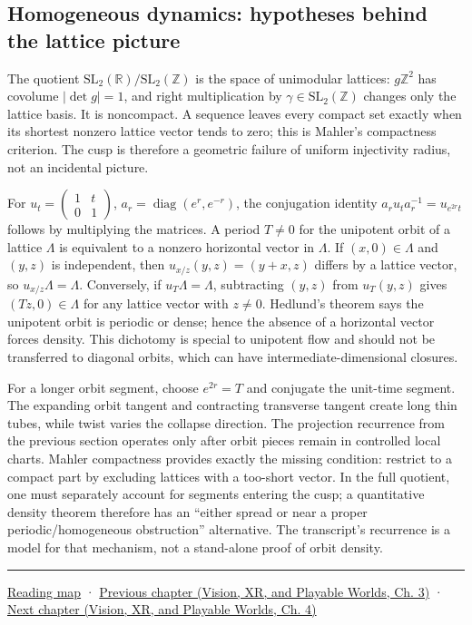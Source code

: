 \subsection{Homogeneous dynamics: hypotheses behind the lattice picture}\label{04-visual-computing-ii-ch033-homogeneous-dynamics-hypotheses-behind-the-lattice-picture}

The quotient \(\mathrm{SL}_2(\mathbb R)/\mathrm{SL}_2(\mathbb Z)\) is the space of unimodular lattices: \(g\mathbb Z^2\) has covolume \(|\det g|=1\), and right multiplication by \(\gamma\in\mathrm{SL}_2(\mathbb Z)\) changes only the lattice basis. It is noncompact. A sequence leaves every compact set exactly when its shortest nonzero lattice vector tends to zero; this is Mahler's compactness criterion. The cusp is therefore a geometric failure of uniform injectivity radius, not an incidental picture.

For \(u_t=\begin{pmatrix}1&t\\0&1\end{pmatrix}\), \(a_r=\operatorname{diag}(e^r,e^{-r})\), the conjugation identity \(a_ru_ta_r^{-1}=u_{e^{2r}t}\) follows by multiplying the matrices. A period \(T\ne0\) for the unipotent orbit of a lattice \(\Lambda\) is equivalent to a nonzero horizontal vector in \(\Lambda\). If \((x,0)\in\Lambda\) and \((y,z)\) is independent, then \(u_{x/z}(y,z)=(y+x,z)\) differs by a lattice vector, so \(u_{x/z}\Lambda=\Lambda\). Conversely, if \(u_T\Lambda=\Lambda\), subtracting \((y,z)\) from \(u_T(y,z)\) gives \((Tz,0)\in\Lambda\) for any lattice vector with \(z\ne0\). Hedlund's theorem says the unipotent orbit is periodic or dense; hence the absence of a horizontal vector forces density. This dichotomy is special to unipotent flow and should not be transferred to diagonal orbits, which can have intermediate-dimensional closures.

For a longer orbit segment, choose \(e^{2r}=T\) and conjugate the unit-time segment. The expanding orbit tangent and contracting transverse tangent create long thin tubes, while twist varies the collapse direction. The projection recurrence from the previous section operates only after orbit pieces remain in controlled local charts. Mahler compactness provides exactly the missing condition: restrict to a compact part by excluding lattices with a too-short vector. In the full quotient, one must separately account for segments entering the cusp; a quantitative density theorem therefore has an ``either spread or near a proper periodic/homogeneous obstruction'' alternative. The transcript's recurrence is a model for that mechanism, not a stand-alone proof of orbit density.

\begin{center}\rule{0.5\linewidth}{0.5pt}\end{center}

\hyperref[volume-reading-map]{Reading map} · \href{../07-Vision-XR-and-Playable-Worlds/main.pdf\#nameddest=04-visual-computing-ii-ch032-pose-estimation-and-robust-fitting}{Previous chapter (Vision, XR, and Playable Worlds, Ch. 3)} · \href{../07-Vision-XR-and-Playable-Worlds/main.pdf\#nameddest=04-visual-computing-ii-ch034-learned-3d-shapes-and-scene-representations}{Next chapter (Vision, XR, and Playable Worlds, Ch. 4)}
